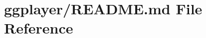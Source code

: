 \hypertarget{ggplayer_2_r_e_a_d_m_e_8md}{\section{ggplayer/\-R\-E\-A\-D\-M\-E.md File Reference}
\label{ggplayer_2_r_e_a_d_m_e_8md}
}
